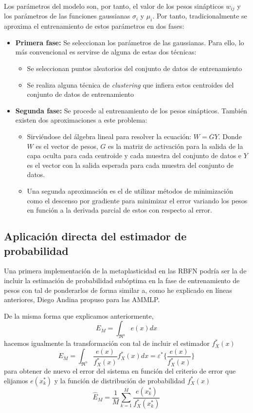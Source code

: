 \documentclass[10pt,a4paper]{report}
\begin{document}
Los parámetros del modelo son, por tanto, el valor de los pesos sinápticos $w_{ij}$ y los parámetros de las funciones gaussianas $\sigma_i$ y $\mu_i$. Por tanto, tradicionalmente se aproxima el entrenamiento de estos parámetros en dos fases:
\begin{itemize}
	\item \textbf{Primera fase:} Se seleccionan los parámetros de las gaussianas. Para ello, lo más convencional es servirse de alguna de estas dos técnicas:
	\begin{itemize}
		\item Se seleccionan puntos aleatorios del conjunto de datos de entrenamiento
		\item Se realiza alguna técnica de \textit{clustering} que infiera estos centroides del conjunto de datos de entrenamiento
	\end{itemize}
	\item \textbf{Segunda fase:} Se procede al entrenamiento de los pesos sinápticos. También existen dos aproximaciones a este problema:
	\begin{itemize}
		\item Sirviéndose del álgebra lineal para resolver la ecuación: $W=GY$. Donde $W$ es el vector de pesos, $G$ es la matriz de activación para la salida de la capa oculta para cada centroide y cada muestra del conjunto de datos e $Y$ es el vector con la salida esperada para cada muestra del conjunto de datos.
		\item Una segunda aproximación es el de utilizar métodos de minimización como el descenso por gradiente para minimizar el error variando los pesos en función a la derivada parcial de estos con respecto al error.
	\end{itemize}
\end{itemize}

\subsection{Aplicación directa del estimador de probabilidad}
Una primera implementación de la metaplasticidad en las RBFN podría ser la de incluir la estimación de probabilidad subóptima en la fase de entrenamiento de pesos con tal de ponderarlos de forma similar a, como he explicado en líneas anteriores, Diego Andina propuso para las AMMLP\citep{Andina2009}.

De la misma forma que explicamos anteriormente, 
\begin{equation}
	E_M = \int_{\Re^n}{e(x)dx}
\end{equation}
hacemos igualmente la transformación con tal de incluir el estimador $f^*_X(x)$
\begin{equation}
	\label{metaRBFN1}
	E_M = \int_{\Re^n}\dfrac{e(x)}{f^*_X(x)}f^*_X(x)dx = \varepsilon^*\lbrace\dfrac{e(x)}{f^*_X(x)}\rbrace
\end{equation}
para obtener de nuevo el error del sistema en función del criterio de error que elijamos $e(x^*_k)$ y la función de distribución de probabilidad $f^*_X(x)$
\begin{equation}
	\label{metaRBFN2}
	\widehat{E}_M=\dfrac{1}{M}\sum^M_{k=1}\dfrac{e(x^*_k)}{f^*_X(x^*_k)}
\end{equation}
\end{document}
